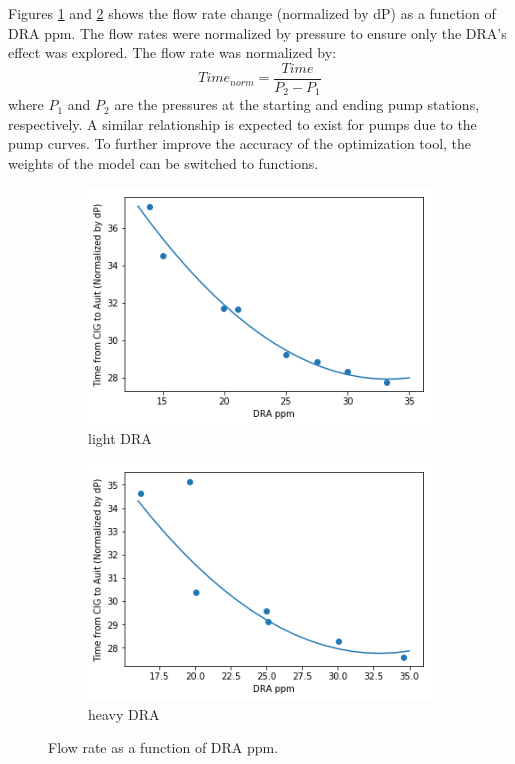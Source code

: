 Figures \ref{fig:08light_dra_curve} and \ref{fig:08heavy_dra_curve} shows the flow rate change (normalized by dP) as a function of DRA ppm. The flow rates were normalized by pressure to ensure only the DRA's effect was explored.  The flow rate was normalized by:
\begin{equation}
    Time_{norm} = \frac{Time}{P_2 - P_1}
\end{equation}
where $P_1$ and $P_2$ are the pressures at the starting and ending pump stations, respectively. A similar relationship is expected to exist for pumps due to the pump curves.  To further improve the accuracy of the optimization tool, the weights of the model can be switched to functions.  
\begin{figure}
    \centering
    \begin{subfigure}[b]{0.48\textwidth}
        \includegraphics[width=\textwidth]{images/suncor/08Sweet_dra_curve.png}
        \caption{light DRA}
        \label{fig:08light_dra_curve}
    \end{subfigure}
    \begin{subfigure}[b]{0.48\textwidth}
        \includegraphics[width=\textwidth]{images/suncor/08Sour_dra_curve.png}
        \caption{heavy DRA}
        \label{fig:08heavy_dra_curve}
    \end{subfigure}
        \caption{Flow rate as a function of DRA ppm.}
        \label{fig:my_label}
\end{figure}

